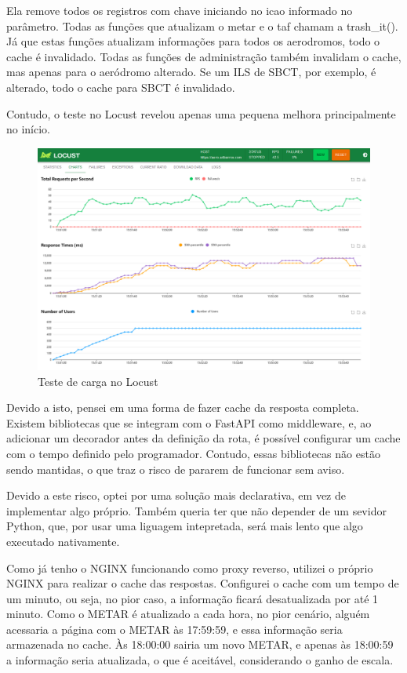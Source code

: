 Ela remove todos os registros com chave iniciando no
icao informado no parâmetro. Todas as funções que atualizam o metar e o taf chamam
a trash\_it(). Já que estas funções atualizam informações para todos os aerodromos,
todo o cache é invalidado. Todas as funções de administração também invalidam o cache,
mas apenas para 
o aeródromo alterado. Se um ILS de SBCT, por exemplo, é alterado, todo o cache
para SBCT é invalidado.

Contudo, o teste no Locust revelou apenas uma pequena melhora principalmente no
início.

\begin{figure}[ht]
    \begin{center}
    \includegraphics[width=400pt]{img/locust-cache-redis.png}
    \caption{Teste de carga no Locust}
    \label{fig:locust-no-cache}
    \end{center}
\end{figure}

Devido a isto, 
pensei em uma forma de fazer cache da resposta completa. Existem bibliotecas que 
se integram com o FastAPI como middleware, e, ao adicionar um decorador antes da
definição da rota, é possível configurar um cache com o tempo definido pelo 
programador. Contudo, essas bibliotecas não estão sendo mantidas, o que traz o 
risco de pararem de funcionar sem aviso.

Devido a este risco, optei por uma solução mais declarativa, em vez de implementar
algo próprio. Também queria ter que não depender de um sevidor Python, que, por
usar uma liguagem intepretada, será mais lento que algo executado nativamente.

Como já tenho o NGINX funcionando como proxy reverso, utilizei o próprio NGINX 
para realizar o cache das respostas. Configurei o cache com um tempo de um minuto, 
ou seja, no pior caso, a informação ficará desatualizada por até 1 minuto. Como 
o METAR é atualizado a cada hora, no pior cenário, alguém acessaria a página com 
o METAR às 17:59:59, e essa informação seria armazenada no cache. Às 18:00:00 
sairia um novo METAR, e apenas às 18:00:59 a informação seria atualizada, o que
 é aceitável, considerando o ganho de escala.

